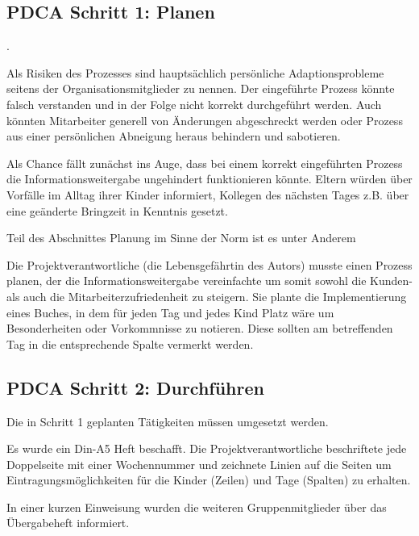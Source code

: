 \subsection{PDCA Schritt 1: Planen}
\citep[][23]{ISO9001}.

Als Risiken des Prozesses sind hauptsächlich persönliche Adaptionsprobleme seitens der Organisationsmitglieder zu nennen. Der eingeführte Prozess könnte falsch verstanden und in der Folge nicht korrekt durchgeführt werden. Auch könnten Mitarbeiter generell von Änderungen abgeschreckt werden oder Prozess aus einer persönlichen Abneigung heraus behindern und sabotieren.

Als Chance fällt zunächst ins Auge, dass bei einem korrekt eingeführten Prozess die Informationsweitergabe ungehindert funktionieren könnte. Eltern würden über Vorfälle im Alltag ihrer Kinder informiert, Kollegen des nächsten Tages z.B. über eine geänderte Bringzeit in Kenntnis gesetzt. 

Teil des Abschnittes Planung im Sinne der Norm ist es unter Anderem \citep[][23]{ISO9001}

Die Projektverantwortliche (die Lebensgefährtin des Autors) musste einen Prozess planen, der die Informationsweitergabe vereinfachte um somit sowohl die Kunden- als auch die Mitarbeiterzufriedenheit zu steigern. Sie plante die Implementierung eines Buches, in dem für jeden Tag und jedes Kind Platz wäre um Besonderheiten oder Vorkommnisse zu notieren. Diese sollten am betreffenden Tag in die entsprechende Spalte vermerkt werden.

\subsection{PDCA Schritt 2: Durchführen}

Die in Schritt 1 geplanten Tätigkeiten müssen umgesetzt werden.

Es wurde ein Din-A5 Heft beschafft. Die Projektverantwortliche beschriftete jede Doppelseite mit einer Wochennummer und zeichnete Linien auf die Seiten um Eintragungsmöglichkeiten für die Kinder (Zeilen) und Tage (Spalten) zu erhalten. 

In einer kurzen Einweisung wurden die weiteren Gruppenmitglieder über das Übergabeheft informiert.

